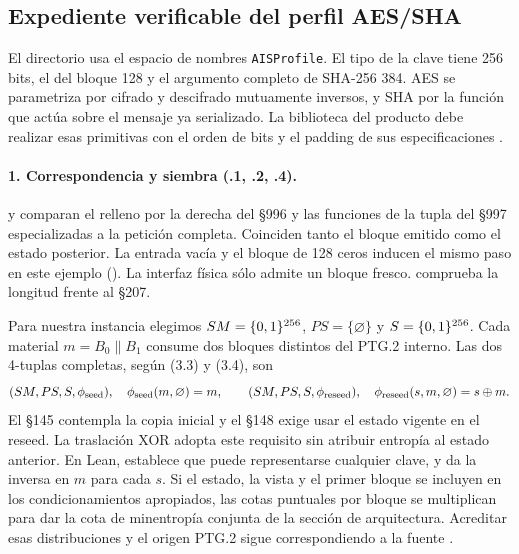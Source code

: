 \subsection{Expediente verificable del perfil AES/SHA}
\label{sec:ais-lean}
El directorio  usa el espacio de nombres
\texttt{AISProfile}. El tipo de la clave tiene 256 bits, el del bloque
128 y el argumento completo de SHA-256 384. AES se parametriza por
cifrado y descifrado mutuamente inversos, y SHA por la función que actúa
sobre el mensaje ya serializado. La biblioteca del producto debe realizar
esas primitivas con el orden de bits y el padding de sus especificaciones
\cite{aes,sha}.

\paragraph{1. Correspondencia y siembra (.1, .2, .4).}
 y  comparan el relleno por la derecha del §996 y las funciones de la
tupla del §997 especializadas a la petición completa. Coinciden tanto
el bloque emitido como el estado posterior. La entrada vacía y el
bloque de 128 ceros inducen el mismo paso en este ejemplo
(). La interfaz física sólo admite un bloque
fresco.  comprueba la longitud frente al §207.

Para nuestra instancia elegimos \(SM=\{0,1\}^{256}\), \(PS=\{\varnothing\}\) y
\(S=\{0,1\}^{256}\). Cada material \(m=B_0\|B_1\) consume dos bloques distintos
del PTG.2 interno. Las dos 4-tuplas completas, según (3.3) y (3.4), son
\[
  (SM,PS,S,\phi_{\rm seed}),\quad \phi_{\rm seed}(m,\varnothing)=m,
  \qquad
  (SM,PS,S,\phi_{\rm reseed}),\quad
  \phi_{\rm reseed}(s,m,\varnothing)=s\oplus m .
\]
El §145 contempla la copia inicial y el §148 exige usar el estado vigente
en el reseed. La traslación XOR adopta este requisito sin atribuir entropía
al estado anterior. En Lean,  establece que puede
representarse cualquier clave, y  da la inversa en
\(m\) para cada \(s\). Si el estado, la vista y el primer bloque se incluyen
en los condicionamientos apropiados, las cotas puntuales por bloque
se multiplican para dar la cota de minentropía conjunta de la
sección de arquitectura. Acreditar esas distribuciones y el origen PTG.2
sigue correspondiendo a la fuente \cite[§§143--150 y 205--207]{ais}.

